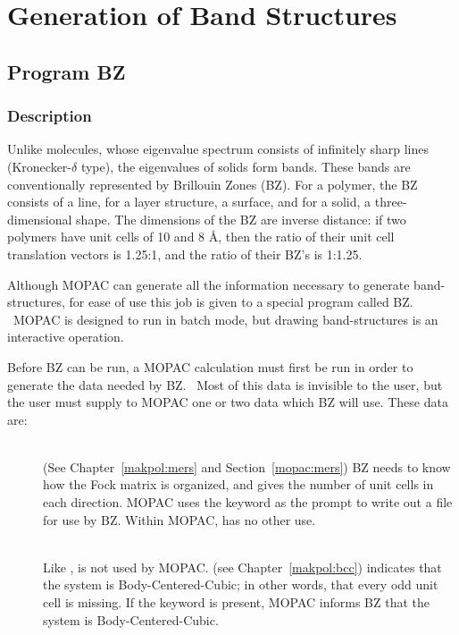\chapter{Generation of Band Structures}
\section{Program BZ}
\subsection{Description} 
Unlike molecules, whose eigenvalue spectrum consists of infinitely sharp lines
(Kronecker-$\delta$ type), the eigenvalues of solids form bands.  These bands
are conventionally represented by Brillouin Zones (BZ).  For a polymer, the BZ
consists of a line, for a layer structure, a surface, and for a solid, a
three-dimensional shape.  The dimensions of the BZ are inverse distance: if two
polymers have unit cells of 10 and 8 \AA, then the ratio of their unit cell
translation vectors is 1.25:1, and the ratio of their BZ's is 1:1.25.

Although MOPAC can generate all the information necessary  to generate
band-structures, for ease of use this job is given to a special program called
BZ. \  MOPAC is designed to run in batch mode, but drawing band-structures is
an interactive operation.

Before BZ can be run, a MOPAC calculation must first be run in order to
generate the data needed by BZ. \  Most of this data is invisible to the user,
but the user must supply to MOPAC one or two data which BZ will use.  These
data are:

\begin{description}
\item[]~\\
(See Chapter~\ref{makpol:mers}  and Section~\ref{mopac:mers})  BZ needs to know how
the Fock matrix is organized, and   gives the number of unit cells
in each direction.  MOPAC uses the keyword  as the prompt to write
out a file for use by BZ.  Within MOPAC,  has no other use.
\item[ ]~\\
Like ,  is not used by MOPAC.  (see
Chapter~\ref{makpol:bcc})  indicates that the system is Body-Centered-Cubic; in
other words, that every odd unit cell is missing.  If the keyword  is
present, MOPAC informs BZ that the system is Body-Centered-Cubic.
\end{description}


